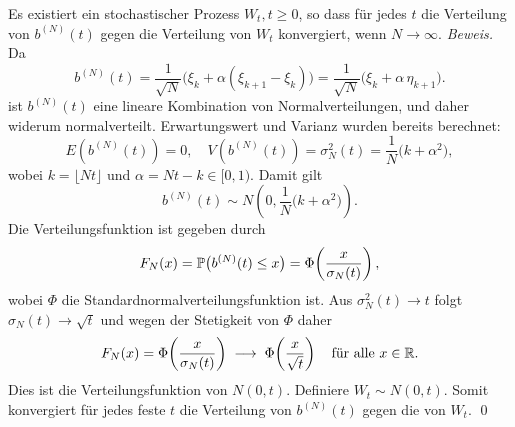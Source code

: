 \begin{lemma}
Es existiert ein stochastischer Prozess $W_t, t \geq 0$, so dass für jedes $t$ die Verteilung von $b^{(N)}(t)$ gegen die Verteilung von $W_t$ konvergiert, wenn $N \to \infty$.
\textit{Beweis.}
Da 
$$b^{(N)}(t) = \frac{1}{\sqrt{N}}\big(\xi_k+\alpha(\xi_{k+1}-\xi_k)\big)
=\frac{1}{\sqrt{N}}\big(\xi_k+\alpha\,\eta_{k+1}\big).
$$
ist $b^{(N)}(t)$ eine lineare Kombination von Normalverteilungen, und daher widerum 
normalverteilt. Erwartungswert und Varianz wurden bereits berechnet:
$$
E(b^{(N)}(t)) = 0, \quad V(b^{(N)}(t)) = \sigma_N^2(t) = \frac{1}{N}\big(k+\alpha^2\big),
$$
wobei $k=\lfloor Nt \rfloor$ und $\alpha=Nt-k\in[0,1)$. Damit gilt
$$
b^{(N)}(t) \sim N\left(0,\frac{1}{N}\big(k+\alpha^2\big)\right).
$$
Die Verteilungsfunktion ist gegeben durch
$$
F_N(x)=\Bbb P\big(b^{(N)}(t)\le x\big)=\Phi\!\left(\frac{x}{\sigma_N(t)}\right),
$$
wobei $\Phi$ die Standardnormalverteilungsfunktion ist. Aus $\sigma_N^2(t)\to t$ folgt $\sigma_N(t)\to \sqrt{t}$ und wegen der Stetigkeit von $\Phi$ daher
$$
F_N(x)=\Phi\!\left(\frac{x}{\sigma_N(t)}\right)\;\longrightarrow\;\Phi\!\left(\frac{x}{\sqrt{t}}\right)\quad\text{für alle }x\in\Bbb R.
$$
Dies ist die Verteilungsfunktion von $N(0,t)$. Definiere $W_t\sim N(0,t)$. Somit konvergiert für jedes feste $t$ die Verteilung von $b^{(N)}(t)$ gegen die von $W_t$. 
\qed
\end{lemma}

